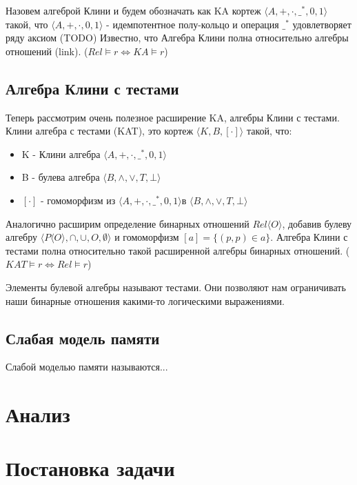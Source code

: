 \documentclass[times
              ]{itmo-student-thesis}
\begin{document}
      Назовем алгеброй Клини и будем обозначать как KA кортеж $\langle A,+,\cdot,\_^*,0,1\rangle$ такой, что $\langle A, +, \cdot, 0, 1 \rangle$ - идемпотентное полу-кольцо и операция $ \_^* $ удовлетворяет ряду аксиом (TODO)
      Известно, что Алгебра Клини полна относительно алгебры отношений (link).
      ($ Rel \models r \Leftrightarrow KA \models r$)

    \subsection{Алгебра Клини с тестами}
      Теперь рассмотрим очень полезное расширение KA, алгебры Клини с тестами.
      Клини алгебра с тестами (KAT), это кортеж $\langle K, B, [\cdot] \rangle$ такой, что:

      \begin{itemize}
        \item K - Клини алгебра $\langle A, +, \cdot, \_^*, 0, 1 \rangle $
        \item B - булева алгебра $\langle B, \wedge, \vee, T, \bot \rangle $
        \item $ [\cdot] $ - гомоморфизм из $\langle A, +, \cdot, \_^*, 0, 1 \rangle  $в $\langle B, \wedge, \vee, T, \bot \rangle$
      \end{itemize}

      Аналогично расширим определение бинарных отношений $Rel \langle O \rangle $, добавив булеву алгебру $\langle P\langle O \rangle, \cap, \cup, O, \emptyset \rangle$ и гомоморфизм $ [a] = \{(p, p) \in a\} $.
      Алгебра Клини с тестами полна относительно такой расширенной алгебры бинарных отношений.
      ($KAT \models r \Leftrightarrow Rel \models r$)

      Элементы булевой алгебры называют тестами. Они позволяют нам ограничивать наши бинарные отношения какими-то логическими выражениями.

    \subsection{Слабая модель памяти}
      Слабой моделью памяти называются...

  \section{Анализ}

  \section{Постановка задачи}
\end{document}
